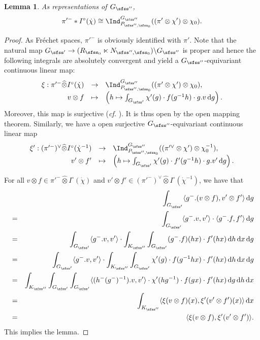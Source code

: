 \documentclass[12pt,a4paper]{amsart}
\newcommand{\od}{\operatorname{d}}
\newcommand{\la}{\langle}
\newcommand{\ra}{\rangle}
\numberwithin{equation}{section}
\newtheorem{lem}[thm]{Lemma}
\theoremstyle{remark}
\def\cf{\emph{cf.} }
\begin{document}
\begin{lem}\label{isoipi}
 As representations of $G_{\sfss''}$, 
 \[
   \pi'^-*I^\circ (\dot \chi)\cong \Ind_{P_{\sfss'',\sfss_0}}^{G_{\sfss''}} ((\pi'\otimes  \chi')\otimes \chi_0).
   \]
\end{lem}
\begin{proof}
As Fr\'echet spaces, $\pi'^-$ is obviously identified with $\pi'$. 
Note that the natural map $G_{\sfss'}\rightarrow (R_{\sfss_0}\ltimes N_{\sfss'', \sfss_0})\backslash G_{\sfss''}$ is proper and hence the following integrals are absolutely convergent and yield a $G_{\sfss''}$-equivariant continuous linear map:
\[
\begin{array}{rcl}
\xi:   \pi'^-\widehat \otimes I^\circ (\dot \chi)&\rightarrow & \Ind_{P_{\sfss'',\sfss_0}}^{G_{\sfss''}} ((\pi'\otimes \chi')\otimes \chi_0),\\
   v\otimes f &\mapsto  & \left(h\mapsto\int_{G_{\sfss'}}\chi'(g)\cdot  f(g^{-1}h)\cdot g.v\od\! g\right). 
   \end{array}
\]
Moreover, this map is surjective (\cf \cite[Section 6.2]{CS21}). It is thus open by the open mapping theorem. Similarly, we have a open surjective 
$G_{\sfss''}$-equivariant  continuous linear map
\[
\begin{array}{rcl}
\xi':   (\pi'^-)^\vee\widehat \otimes I^\circ (\dot \chi^{-1})&\rightarrow & \Ind_{P_{\sfss'',\sfss_0}}^{G_{\sfss''}} ((\pi'^\vee\otimes \chi')\otimes \chi_0^{-1}),\\
   v'\otimes f' &\mapsto  & \left(h\mapsto\int_{G_{\sfss'}} \chi'(g)\cdot  f'(g^{-1}h)\cdot g.v'\od\! g\right). 
   \end{array}
\]

For all $v\otimes f \in \pi'^-\widehat \otimes I^\circ (\dot \chi)$ and $v'\otimes f' \in (\pi'^-)^\vee \widehat \otimes I^\circ (\dot \chi^{-1})$, we have that
\begin{eqnarray*}
 && \int_{G_{\sfss'}}\la g^-.(v\otimes f), v'\otimes f'\ra \od\! g\\
 &=& \int_{G_{\sfss'}}\la g^-.v, v'\ra \cdot \la g^-.f, f'\ra \od\! g\\
 &=& \int_{G_{\sfss'}}\la g^-.v, v'\ra \cdot \int_{K_{\sfss''}} \int_{G_{\sfss'}}   (g^-.f)(hx) \cdot  f'(hx)  \od\! h \od \! x \od \! g\\
 &=& \int_{G_{\sfss'}}\la g^-.v, v'\ra \cdot \int_{K_{\sfss''}} \int_{G_{\sfss'}}  \chi'(g) \cdot f(g^{-1}h x) \cdot  f'(hx)  \od\! h \od \! x \od \! g\\
  &=& \int_{K_{\sfss''}}  \int_{G_{\sfss'}}  \int_{G_{\sfss'}} \la (h^- (g^-)^{-1}).v, v'\ra \cdot \chi'(hg^{-1}) \cdot f(gx) \cdot  f'(hx)  \od\! g \od \! h \od \! x \\
 &=&  \int_{K_{\sfss''}}\la  \xi(v\otimes f)(x),\xi'(v'\otimes f')(x)\ra  \od \! x\\
 &=& \la  \xi(v\otimes f),\xi'(v'\otimes f')\ra.
\end{eqnarray*}
This implies the lemma. 
\end{proof}
\end{document}
